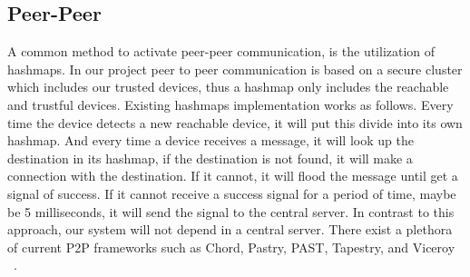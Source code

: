 \subsection{Peer-Peer}
A common method to activate peer-peer communication, is the utilization of hashmaps. 
In our project peer to peer communication is based on a secure cluster which includes our trusted devices, thus a hashmap only includes the reachable and trustful devices. 
Existing hashmaps implementation works as follows.
Every time the device detects a new reachable device, it will put this divide into its own hashmap. 
And every time a device receives a message, it will look up the destination in its hashmap, if the destination is not found, it will make a connection with the destination. 
If it cannot, it will flood the message until get a signal of success. 
If it cannot receive a success signal for a period of time, maybe be 5 milliseconds, it will send the signal to the central server.
In contrast to this approach, our system will not depend in a central server.
There exist a plethora of current P2P frameworks such as Chord, Pastry, PAST, Tapestry, and Viceroy ~\cite{LUAsurvey}.
% 
